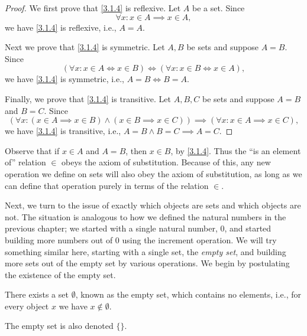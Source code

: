 \begin{proof}
  We first prove that \cref{3.1.4} is reflexive.
  Let \(A\) be a set.
  Since
  \[
    \forall x : x \in A \implies x \in A,
  \]
  we have \cref{3.1.4} is reflexive, i.e., \(A = A\).

  Next we prove that \cref{3.1.4} is symmetric.
  Let \(A, B\) be sets and suppose \(A = B\).
  Since
  \[
    (\forall x : x \in A \iff x \in B) \iff (\forall x : x \in B \iff x \in A),
  \]
  we have \cref{3.1.4} is symmetric, i.e., \(A = B \iff B = A\).

  Finally, we prove that \cref{3.1.4} is transitive.
  Let \(A, B, C\) be sets and suppose \(A = B\) and \(B = C\).
  Since
  \[
    (\forall x : (x \in A \implies x \in B) \land (x \in B \implies x \in C)) \implies (\forall x : x \in A \implies x \in C),
  \]
  we have \cref{3.1.4} is transitive, i.e., \(A = B \land B = C \implies A = C\).
\end{proof}

\begin{note}
  Observe that if \(x \in A\) and \(A = B\), then \(x \in B\), by \cref{3.1.4}.
  Thus the ``is an element of'' relation \(\in\) obeys the axiom of substitution.
  Because of this, any new operation we define on sets will also obey the axiom of substitution, as long as we can define that operation purely in terms of the relation \(\in\).
\end{note}

\begin{note}
  Next, we turn to the issue of exactly which objects are sets and which objects are not.
  The situation is analogous to how we defined the natural numbers in the previous chapter;
  we started with a single natural number, \(0\), and started building more numbers out of \(0\) using the increment operation.
  We will try something similar here, starting with a single set, the \emph{empty set},
  and building more sets out of the empty set by various operations.
  We begin by postulating the existence of the empty set.
\end{note}

\begin{ax}\label{3.2}
  There exists a set \(\emptyset\), known as the empty set, which contains no elements, i.e., for every object \(x\) we have \(x \notin \emptyset\).
\end{ax}

\begin{note}
  The empty set is also denoted \(\{\}\).
\end{note}

